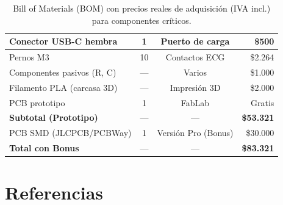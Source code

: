 \documentclass[letterpaper,11pt]{article}
\begin{document}
\begin{table}[H]
\begin{tabular}{|l|c|c|r|}
        Conector USB-C hembra         & 1                 & Puerto de carga      & \$500                \\ \hline
        Pernos M3                     & 10                & Contactos ECG        & \$2.264              \\ \hline
        Componentes pasivos (R, C)    & ---               & Varios               & \$1.000              \\ \hline
        Filamento PLA (carcasa 3D)    & ---               & Impresión 3D         & \$2.000              \\ \hline
        PCB prototipo                 & 1                 & FabLab               & Gratis               \\ \hline
        \rowcolor[HTML]{D5F5E3}
        \textbf{Subtotal (Prototipo)} & ---               & ---                  & \textbf{\$53.321}    \\ \hline
        PCB SMD (JLCPCB/PCBWay)       & 1                 & Versión Pro (Bonus)  & \$30.000             \\ \hline
        \rowcolor[HTML]{ABEBC6}
        \textbf{Total con Bonus}      & ---               & ---                  & \textbf{\$83.321}    \\ \hline
    \end{tabular}
    \caption{Bill of Materials (BOM) con precios reales de adquisición (IVA incl.) para componentes críticos.}
    \label{tab:bom}
\end{table}


\section{Referencias}



\end{document}
